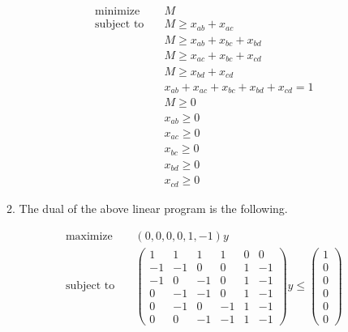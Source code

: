 \documentclass[letterpaper,11pt]{article}
\begin{document}
\begin{enumerate}
\begin{enumerate}
                \begin{align*}
                    \text{minimize} \quad &
                        M \\
                    \text{subject to} \quad
                        & M \geq x_{ab} + x_{ac} \\
                        & M \geq x_{ab} + x_{bc} + x_{bd} \\
                        & M \geq x_{ac} + x_{bc} + x_{cd} \\
                        & M \geq x_{bd} + x_{cd} \\
                        & x_{ab} + x_{ac} + x_{bc} + x_{bd} + x_{cd} = 1 \\
                        & M \geq 0 \\
                        & x_{ab} \geq 0 \\
                        & x_{ac} \geq 0 \\
                        & x_{bc} \geq 0 \\
                        & x_{bd} \geq 0 \\
                        & x_{cd} \geq 0
                \end{align*}

            \item The dual of the above linear program is the following.

                \begin{align*}
                    \text{maximize} \quad
                        & (0, 0, 0, 0, 1, -1) y \\
                    \text{subject to} \quad &
                    \left(
                        \begin{array}{cccccc}
                            1  & 1  & 1  & 1  & 0 & 0 \\
                            -1 & -1 & 0  & 0  & 1 & -1 \\
                            -1 & 0  & -1 & 0  & 1 & -1 \\
                            0  & -1 & -1 & 0  & 1 & -1 \\
                            0  & -1 & 0  & -1 & 1 & -1 \\
                            0  & 0  & -1 & -1 & 1 & -1
                        \end{array}
                    \right)
                    y
                    \leq
                    \left(
                        \begin{array}{c}
                            1 \\
                            0 \\
                            0 \\
                            0 \\
                            0 \\
                            0
                        \end{array}
                    \right)
                \end{align*}


\end{enumerate}
\end{enumerate}
\end{document}
